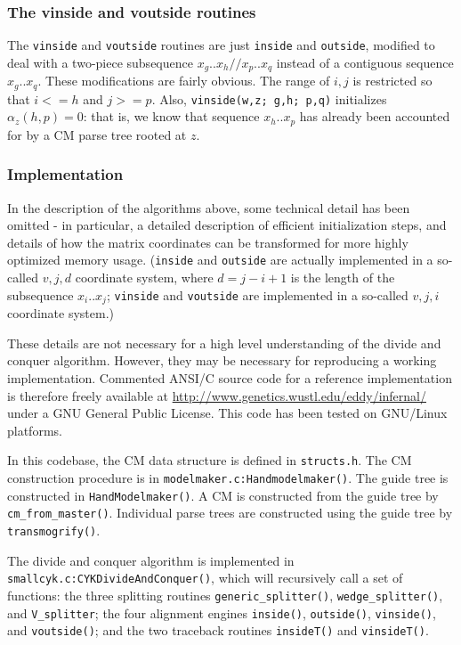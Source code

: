 \documentclass[11pt]{article}
\begin{document}
\subsubsection{The vinside and voutside routines}

The \texttt{vinside} and \texttt{voutside} routines are just
\texttt{inside} and \texttt{outside}, modified to deal with a
two-piece subsequence $x_g..x_h//x_p..x_q$ instead of a contiguous
sequence $x_g..x_q$. These modifications are fairly obvious. The
range of $i,j$ is restricted so that $i<=h$ and $j>=p$.  Also,
\texttt{vinside(w,z; g,h; p,q)} initializes $\alpha_z(h,p) = 0$: that
is, we know that sequence $x_h..x_p$ has already been accounted for by
a CM parse tree rooted at $z$.

\subsubsection{Implementation}

In the description of the algorithms above, some technical detail has
been omitted - in particular, a detailed description of efficient
initialization steps, and details of how the matrix coordinates can be
transformed for more highly optimized memory usage. (\texttt{inside}
and \texttt{outside} are actually implemented in a so-called $v,j,d$
coordinate system, where $d = j-i+1$ is the length of the subsequence
$x_i..x_j$; \texttt{vinside} and \texttt{voutside} are implemented in
a so-called $v,j,i$ coordinate system.) 

These details are not necessary for a high level understanding of the
divide and conquer algorithm. However, they may be necessary for
reproducing a working implementation. Commented ANSI/C source code for
a reference implementation is therefore freely available at
\url{http://www.genetics.wustl.edu/eddy/infernal/} under a GNU General
Public License. This code has been tested on GNU/Linux platforms.

In this codebase, the CM data structure is defined in
\texttt{structs.h}. The CM construction procedure is in
\texttt{modelmaker.c:Handmodelmaker()}. The guide tree is constructed
in \texttt{HandModelmaker()}. A CM is constructed from the guide tree
by \texttt{cm\_from\_master()}. Individual parse trees are constructed
using the guide tree by \texttt{transmogrify()}.

The divide and conquer algorithm is implemented in
\texttt{smallcyk.c:CYKDivideAndConquer()}, which will recursively call
a set of functions: the three splitting routines
\texttt{generic\_splitter()}, \texttt{wedge\_splitter()}, and
\texttt{V\_splitter}; the four alignment engines \texttt{inside()},
\texttt{outside()}, \texttt{vinside()}, and \texttt{voutside()}; and
the two traceback routines \texttt{insideT()} and \texttt{vinsideT()}.
\end{document}
